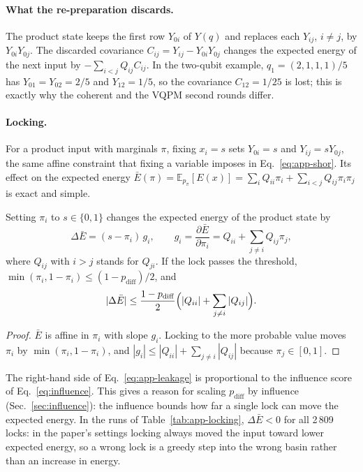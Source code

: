\paragraph{What the re-preparation discards.} The product state keeps the first row $Y_{0i}$ of $Y(q)$ and replaces each $Y_{ij}$, $i\ne j$, by $Y_{0i}Y_{0j}$. The discarded covariance $C_{ij}=Y_{ij}-Y_{0i}Y_{0j}$ changes the expected energy of the next input by $-\sum_{i<j}Q_{ij}C_{ij}$. In the two-qubit example, $q_1=(2,1,1,1)/5$ has $Y_{01}=Y_{02}=2/5$ and $Y_{12}=1/5$, so the covariance $C_{12}=1/25$ is lost; this is exactly why the coherent and the VQPM second rounds differ.

\paragraph{Locking.} For a product input with marginals $\pi$, fixing $x_i=s$ sets $Y_{0i}=s$ and $Y_{ij}=sY_{0j}$, the same affine constraint that fixing a variable imposes in Eq.~\eqref{eq:app-shor}. Its effect on the expected energy $\bar E(\pi)=\mathbb{E}_{p_\pi}[E(x)]=\sum_iQ_{ii}\pi_i+\sum_{i<j}Q_{ij}\pi_i\pi_j$ is exact and simple.

\begin{lemma}
\label{lem:leakage}
Setting $\pi_i$ to $s\in\{0,1\}$ changes the expected energy of the product state by
\begin{equation}
\Delta\bar E=(s-\pi_i)\,g_i,\qquad g_i=\frac{\partial\bar E}{\partial\pi_i}=Q_{ii}+\sum_{j\ne i}Q_{ij}\pi_j ,
\end{equation}
where $Q_{ij}$ with $i>j$ stands for $Q_{ji}$. If the lock passes the threshold, $\min(\pi_i,1-\pi_i)\le(1-p_{\mathrm{diff}})/2$, and
\begin{equation}
|\Delta\bar E|\le\frac{1-p_{\mathrm{diff}}}{2}\Bigl(|Q_{ii}|+\sum_{j\ne i}|Q_{ij}|\Bigr).
\label{eq:app-leakage}
\end{equation}
\end{lemma}
\begin{proof}
$\bar E$ is affine in $\pi_i$ with slope $g_i$. Locking to the more probable value moves $\pi_i$ by $\min(\pi_i,1-\pi_i)$, and $|g_i|\le|Q_{ii}|+\sum_{j\ne i}|Q_{ij}|$ because $\pi_j\in[0,1]$.
\end{proof}

The right-hand side of Eq.~\eqref{eq:app-leakage} is proportional to the influence score of Eq.~\eqref{eq:influence}. This gives a reason for scaling $p_{\mathrm{diff}}$ by influence (Sec.~\ref{sec:influence}): the influence bounds how far a single lock can move the expected energy. In the runs of Table~\ref{tab:app-locking}, $\Delta\bar E<0$ for all 2\,809 locks: in the paper's settings locking always moved the input toward lower expected energy, so a wrong lock is a greedy step into the wrong basin rather than an increase in energy.

